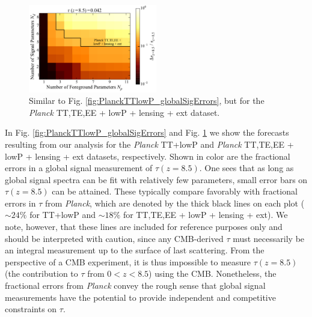 \documentclass[twocolumn,aps,prd,nofootinbib,showpacs]{revtex4-1}
\begin{document}
\begin{figure}[!]
\centering
\includegraphics[width=0.5\textwidth]{figures/PlanckTTTEEElowPlensingext_globalSigErrors.pdf}
\caption{Similar to Fig. \ref{fig:PlanckTTlowP_globalSigErrors}, but for the \emph{Planck} TT,TE,EE + lowP + lensing + ext  dataset.}
\label{fig:PlanckTTTEEElowPlensingext_globalSigErrors}
\end{figure}

In Fig. \ref{fig:PlanckTTlowP_globalSigErrors} and Fig. \ref{fig:PlanckTTTEEElowPlensingext_globalSigErrors} we show the forecasts resulting from our analysis for the \emph{Planck} TT+lowP and \emph{Planck} TT,TE,EE + lowP + lensing + ext  datasets, respectively. Shown in color are the fractional errors in a global signal measurement of $\tau (z=8.5)$. One sees that as long as global signal spectra can be fit with relatively few parameters, small error bars on $\tau(z = 8.5)$ can be attained. These typically compare favorably with fractional errors in $\tau$ from \emph{Planck}, which are denoted by the thick black lines on each plot ($\sim 24\%$ for TT+lowP and $\sim 18\%$ for TT,TE,EE + lowP + lensing + ext). We note, however, that these lines are included for reference purposes only and should be interpreted with caution, since any CMB-derived $\tau$ must necessarily be an integral measurement up to the surface of last scattering. From the perspective of a CMB experiment, it is thus impossible to measure $\tau (z=8.5)$ (the contribution to $\tau$ from $0 < z < 8.5$) using the CMB. Nonetheless, the fractional errors from \emph{Planck} convey the rough sense that global signal measurements have the potential to provide independent and competitive constraints on $\tau$.

\end{document}
